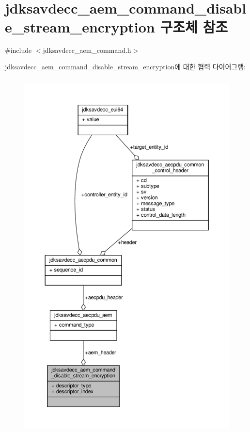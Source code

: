 \hypertarget{structjdksavdecc__aem__command__disable__stream__encryption}{}\section{jdksavdecc\+\_\+aem\+\_\+command\+\_\+disable\+\_\+stream\+\_\+encryption 구조체 참조}
\label{structjdksavdecc__aem__command__disable__stream__encryption}


{\ttfamily \#include $<$jdksavdecc\+\_\+aem\+\_\+command.\+h$>$}



jdksavdecc\+\_\+aem\+\_\+command\+\_\+disable\+\_\+stream\+\_\+encryption에 대한 협력 다이어그램\+:
\nopagebreak
\begin{figure}[H]
\begin{center}
\leavevmode
\includegraphics[height=550pt]{structjdksavdecc__aem__command__disable__stream__encryption__coll__graph}
\end{center}
\end{figure}
